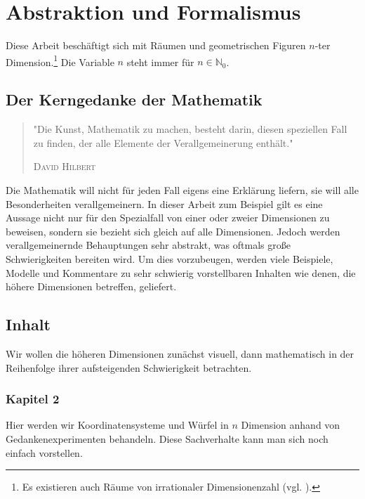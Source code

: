 \chapter{Abstraktion und Formalismus}
\label{sec:AuF}
Diese Arbeit beschäftigt sich mit Räumen und geometrischen Figuren $n$-ter Dimension.\footnote{Es existieren auch Räume von irrationaler Dimensionenzahl (vgl. \cite{Fraktale}).} Die Variable $n$ steht immer für $n\in \mathbb{N}_0$.
\section{Der Kerngedanke der Mathematik}
\begin{quote}
"Die Kunst, Mathematik zu machen, besteht darin, diesen speziellen Fall zu finden, der alle Elemente der Verallgemeinerung enthält."
\begin{flushright}
\textsc{David Hilbert}
\end{flushright}
\end{quote}

Die Mathematik will nicht für jeden Fall eigens eine Erklärung liefern, sie will alle Besonderheiten verallgemeinern. In dieser Arbeit zum Beispiel gilt es eine Aussage nicht nur für den Spezialfall von einer oder zweier Dimensionen zu beweisen, sondern sie bezieht sich gleich auf alle Dimensionen. 
Jedoch werden verallgemeinernde Behauptungen sehr abstrakt, was oftmals große Schwierigkeiten bereiten wird. Um dies vorzubeugen, werden viele Beispiele, Modelle und Kommentare zu sehr schwierig vorstellbaren Inhalten wie denen, die höhere Dimensionen betreffen, geliefert.
\newpage
\section{Inhalt}
 Wir wollen die höheren Dimensionen zunächst visuell, dann mathematisch in der Reihenfolge ihrer aufsteigenden Schwierigkeit betrachten. 
\subsection*{Kapitel 2}
Hier werden wir Koordinatensysteme und Würfel in $n$ Dimension anhand von Gedankenexperimenten behandeln. Diese Sachverhalte kann man sich noch einfach vorstellen.
